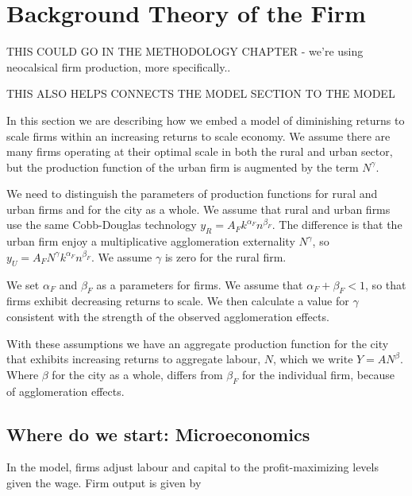 \chapter{Background Theory of the Firm} \label{appendix-firm-theory}

{\color{red}
THIS COULD GO IN THE METHODOLOGY CHAPTER - we're using neocalsical firm production, more specifically..

THIS ALSO HELPS CONNECTS THE MODEL SECTION TO THE MODEL

}

In this section we are describing how we embed a model of diminishing returns to scale firms within an increasing returns to scale economy. 
We assume there are many firms operating at their optimal scale in both the rural and urban sector, but the production function of the urban firm is augmented by the term $N^\gamma$. 



We need to distinguish the parameters of production functions for rural and urban firms and for the city as a whole. We assume that  rural and  urban firms use the same Cobb-Douglas technology ${y_R}=A_Fk^{\alpha_F}n^{\beta_F}$. The difference is that the urban firm enjoy a  multiplicative agglomeration externality $N^\gamma$, so ${y_U}=A_FN^\gamma  k^{\alpha_F}n^{\beta_F}$. We assume $\gamma$ is zero for the rural firm. 

We set $\alpha_F$ and $\beta_F$ as a parameters for firms. We assume that $\alpha_F+\beta_F<1$, so that firms exhibit decreasing returns to scale.  We then calculate a value for $\gamma$ consistent with the strength of the observed agglomeration effects. 


With these assumptions we have an aggregate production function for the city that exhibits increasing returns to aggregate labour, $N$,  which we write $Y=AN^\beta$. Where $\beta$ for the city as a whole, differs from $\beta_F$ for the individual firm, because of agglomeration effects. 


\section{Where do we start: Microeconomics }
In the model, firms adjust labour and capital to the profit-maximizing levels given the wage. %
Firm output is given by

